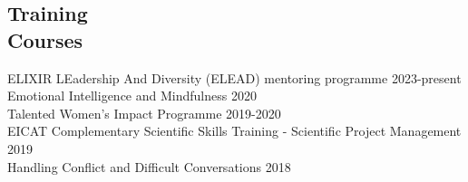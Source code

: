 \documentclass[margin,line]{res}
\begin{document}
\begin{resume}


\section{\sc Training\\ Courses}

ELIXIR LEadership And Diversity (ELEAD) mentoring programme \hfill {2023-present}\\
Emotional Intelligence and Mindfulness \hfill {2020}\\
Talented Women's Impact Programme \hfill {2019-2020}\\
EICAT Complementary Scientific Skills Training - Scientific Project Management \hfill {2019}\\
Handling Conflict and Difficult Conversations \hfill {2018}

\end{resume}
\end{document}
